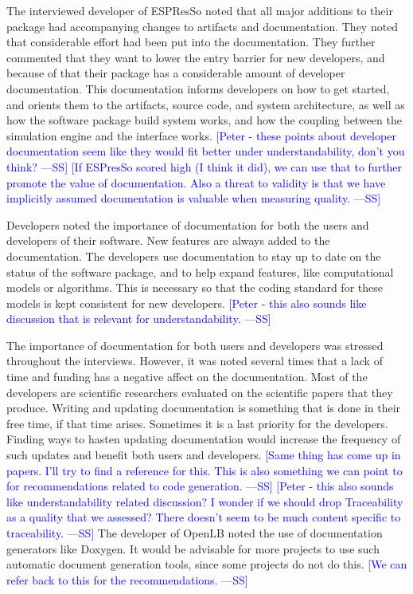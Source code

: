 \documentclass[final, 3p, times, authoryear]{elsarticle}
\newcommand{\authornote}[3]{\textcolor{#1}{[#3 ---#2]}}
\newcommand{\authornote}[3]{}
\newcommand{\wss}[1]{\authornote{blue}{SS}{#1}} %
\begin{document}
The interviewed developer of ESPResSo noted that all major additions to their
package had accompanying changes to artifacts and documentation. They noted that
considerable effort had been put into the documentation. They further commented
that they want to lower the entry barrier for new developers, and because of
that their package has a considerable amount of developer documentation. This
documentation informs developers on how to get started, and orients them to the
artifacts, source code, and system architecture, as well as how the software
package build system works, and how the coupling between the simulation engine
and the interface works.  \wss{Peter - these points about developer
documentation seem like they would fit better under understandability, don't you
think?}  \wss{If ESPresSo scored high (I think it did), we can use that to
further promote the value of documentation.  Also a threat to validity is that
we have implicitly assumed documentation is valuable when measuring quality.}

Developers noted the importance of documentation for both the users and
developers of their software. New features are always added to the
documentation. The developers use documentation to stay up to date on the status
of the software package, and to help expand features, like computational models
or algorithms. This is necessary so that the coding standard for these models is
kept consistent for new developers. \wss{Peter - this also sounds like
discussion that is relevant for understandability.}

The importance of documentation for both users and developers was stressed
throughout the interviews. However, it was noted several times that a lack of
time and funding has a negative affect on the documentation. Most of the
developers are scientific researchers evaluated on the scientific papers that
they produce. Writing and updating documentation is something that is done in
their free time, if that time arises. Sometimes it is a last priority for the
developers. Finding ways to hasten updating documentation would increase the
frequency of such updates and benefit both users and developers.  \wss{Same
thing has come up in papers.  I'll try to find a reference for this.  This is
also something we can point to for recommendations related to code generation.}
\wss{Peter - this also sounds like understandability related discussion?  I
wonder if we should drop Traceability as a quality that we assessed?  There
doesn't seem to be much content specific to traceability.}  The developer of
OpenLB noted the use of documentation generators like Doxygen. It would be
advisable for more projects to use such automatic document generation tools,
since some projects do not do this.  \wss{We can refer back to this for the
recommendations.}
\end{document}
